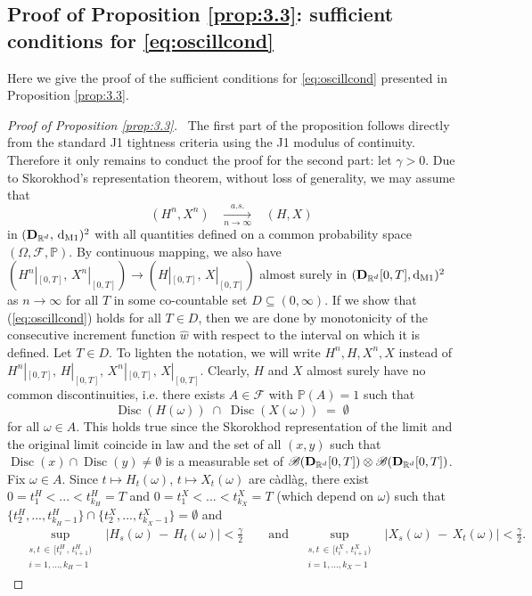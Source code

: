 \documentclass[11pt]{article}
\theoremstyle{definition}\newtheorem{example}[theorem]{Example}
\theoremstyle{definition}\newtheorem{counterexample}[theorem]{Counterexample}
\theoremstyle{definition}\newtheorem{remark}[theorem]{Remark}
\theoremstyle{definition}\newtheorem{defi}[theorem]{Definition}
\numberwithin{equation}{section}
\newcommand{\R}{\mathbb{R}}
\newcommand{\D}{{\bf D}}											%
\newcommand*\diff{\mathop{}\!\mathrm{d}}								%
\newcommand{\Pro}{\mathbb{P}}										%
\renewcommand{\sup}[1]{\underset{#1}{\operatorname{sup}}\;}					%
\renewcommand{\|}{\; : \, \;}											%
\newcommand{\conv}[2]{\; \xrightarrow[ {#1}]{#2} \; }						%
\newcommand{\dM}{\diff_{\operatorname{M1}}}							%
\begin{document}
\subsection{Proof of Proposition \ref{prop:3.3}: sufficient conditions for \eqref{eq:oscillcond}}
\label{subsec:Suff_Cond_AVCO}

Here we give the proof of the sufficient conditions for \eqref{eq:oscillcond} presented in Proposition \ref{prop:3.3}.

\begin{proof}[Proof of Proposition \ref{prop:3.3}] \ 
	The first part of the proposition follows directly from the standard J1 tightness criteria using the J1 modulus of continuity. Therefore it only remains to conduct the proof for the second part: let $\gamma>0$. Due to Skorokhod's representation theorem, without loss of generality, we may assume that 
	$$ (H^n, X^n) \; \; \conv{n \to \infty}{a.s.} \; \; (H,X)$$
	in $(\D_{\R^d}, \, \dM)^2$ with all quantities defined on a common probability space $(\Omega, \mathcal{F}, \Pro)$. By continuous mapping, we also have $(H^n|_{[0,T]}, \, X^n|_{[0,T]}) \to (H|_{[0,T]}, \, X|_{[0,T]})$ almost surely in $(\D_{\R^d}[0,T], \dM)^2$ as $n\to \infty$ for all $T$ in some co-countable set $D\subseteq (0,\infty)$. If we show that (\ref{eq:oscillcond}) holds for all $T \in D$, then we are done by monotonicity of the consecutive increment function $\hat w$ with respect to the interval on which it is defined. Let $T \in D$. To lighten the notation, we will write $H^n, H, X^n, X$ instead of $H^n|_{[0,T]}, \, H|_{[0,T]}, \, X^n|_{[0,T]}, \, X|_{[0,T]}$. Clearly, $H$ and $X$ almost surely have no common discontinuities, i.e. there exists $A \in \mathcal{F}$ with $\Pro(A)=1$ such that $$\operatorname{Disc}(H(\omega)) \; \cap \; \operatorname{Disc}(X(\omega)) \; = \; \emptyset $$
	for all $\omega \in A$. This holds true since the Skorokhod representation of the limit and the original limit coincide in law and the set of all $(x,y)$ such that $\operatorname{Disc}(x) \cap \operatorname{Disc}(y)\neq \emptyset$ is a measurable set of $\mathscr{B}(\D_{\R^d}[0,T]) \otimes \mathscr{B}(\D_{\R^d}[0,T])$. Fix $\omega \in A$. Since $t\mapsto H_t(\omega)$, $t\mapsto X_t(\omega)$ are càdlàg, there exist $0= t_1^H<...<t^H_{k_H}= T$ and $0= t_1^X<...<t^X_{k_X}= T$ (which depend on $\omega$) such that $\{t_2^H,...,t^H_{k_H-1}\} \cap \{t_2^X,...,t^X_{k_X-1}\}= \emptyset$ and
	\begin{align}
		&\sup{\substack{s,t \, \in \, [t_i^H\, , \, t_{i+1}^H) \\ i=1,...,k_H-1}} \; |H_s(\omega) \, -\, H_t(\omega)| < \frac \gamma 2  \qquad \text{and} \quad \sup{\substack{s,t \, \in \, [t_i^X\, , \, t_{i+1}^X) \\ i=1,...,k_X-1}} \; |X_s(\omega) \, -\, X_t(\omega)|  < \frac \gamma 2 . \label{eq:3.12} 

\end{align}
\end{proof}
\end{document}
